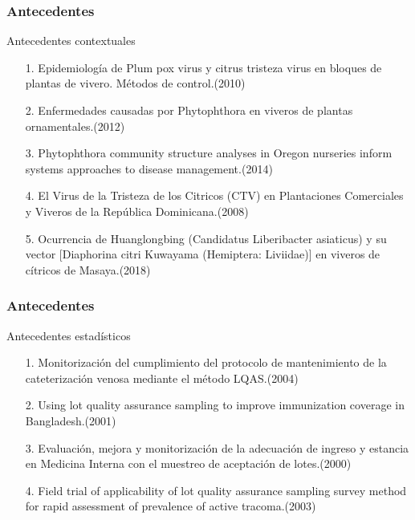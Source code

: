 \documentclass[10.5pt]{beamer}
\begin{document}
\begin{frame}
\frametitle{Antecedentes}
\begin{block}{Antecedentes contextuales}
\begin{itemize}
\justifying
\item[1.]Epidemiología de Plum pox virus y citrus tristeza virus en bloques de plantas de vivero. Métodos de control.(2010)\cite{AC1}
\item[2.]Enfermedades causadas por Phytophthora en viveros de plantas ornamentales.(2012)\cite{AC2}
\item[3.]Phytophthora community structure analyses in Oregon nurseries inform systems approaches to disease management.(2014)\cite{AC3}
\item[4.]El Virus de la Tristeza de los Citricos (CTV) en Plantaciones Comerciales y Viveros de la República Dominicana.(2008)\cite{AC4}
\item[5.]Ocurrencia de Huanglongbing (Candidatus Liberibacter asiaticus) y su vector [Diaphorina citri Kuwayama (Hemiptera: Liviidae)] en viveros de cítricos de Masaya.(2018)\cite{AC5}
\end{itemize}
\end{block}
\end{frame}

\begin{frame}
\frametitle{Antecedentes}
\begin{block}{Antecedentes estadísticos}
\begin{itemize}
\justifying
\item[1.]Monitorización del cumplimiento del protocolo de mantenimiento de la cateterización venosa mediante el método LQAS.(2004)\cite{AE1}
\item[2.]Using lot quality assurance sampling to improve immunization coverage in Bangladesh.(2001)\cite{AE2}
\item[3.]Evaluación, mejora y monitorización de la adecuación de ingreso y estancia en Medicina Interna con el muestreo de aceptación de lotes.(2000)\cite{AE3}
\item[4.]Field trial of applicability of lot quality assurance sampling survey method for rapid assessment of prevalence of active tracoma.(2003)\cite{AE4}
\end{itemize}
\end{block}
\end{frame}
\end{document}
